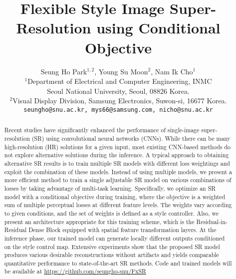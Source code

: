 \documentclass{article}
\title{Flexible Style Image Super-Resolution using Conditional Objective
}
\author{
  Seung Ho Park$^{1,2}$, Young Su Moon$^2$, Nam Ik Cho$^1$ \\
  $^{1}$Department of Electrical and Computer Engineering, INMC\\
Seoul National University, Seoul, 08826 Korea.\\
  $^{2}$Visual Display Division, Samsung Electronics, Suwon-si, 16677 Korea.\\
  \texttt{seungho@snu.ac.kr, mys66@samsung.com, nicho@snu.ac.kr}\\
}
\begin{document}
\maketitle


\begin{abstract}
Recent studies have significantly enhanced the performance of single-image super-resolution (SR) using convolutional neural networks (CNNs). While there can be many high-resolution (HR) solutions for a given input, most existing CNN-based methods do not explore alternative solutions during the inference. A typical approach to obtaining alternative SR results is to train multiple SR models with different loss weightings and exploit the combination of these models. Instead of using multiple models, we present a more efficient method to train a single adjustable SR model on various combinations of losses by taking advantage of multi-task learning. Specifically, we optimize an SR model with a conditional objective during training, where the objective is a weighted sum of multiple perceptual losses at different feature levels. The weights vary according to given conditions, and the set of weights is defined as a style controller. Also, we present an architecture appropriate for this training scheme, which is the Residual-in-Residual Dense Block equipped with spatial feature transformation layers. At the inference phase, our trained model can generate locally different outputs conditioned on the style control map. Extensive experiments show that the proposed SR model produces various desirable reconstructions without artifacts and yields comparable quantitative performance to state-of-the-art SR methods. Code and trained models will be available at \href{https://github.com/seungho-snu/FxSR}{https://github.com/seungho-snu/FxSR}
\end{abstract}


\end{document}
